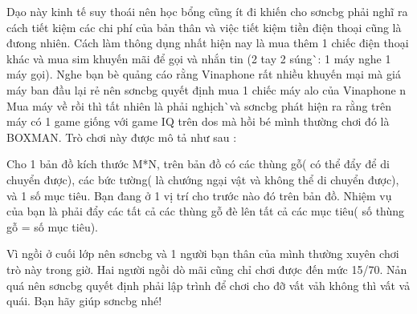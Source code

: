 Dạo này kinh tế suy thoái nên học bổng cũng ít đi khiến cho sơncbg phải nghĩ ra cách tiết kiệm các chi phí của bản thân và việc tiết kiệm tiền điện thoại cũng là đưong nhiên. Cách làm thông dụng nhất hiện nay là mua thêm 1 chiếc điện thoại khác và mua sim khuyến mãi để gọi và nhắn tin (2 tay 2 súng^^ : 1 máy nghe 1 máy gọi). Nghe bạn bè quảng cáo rằng Vinaphone rất nhiều khuyến mại mà giá máy ban đầu lại rẻ nên sơncbg quyết định mua 1 chiếc máy alo của Vinaphone ^^. Mua máy về rồi thì tất nhiên là phải nghịch^^ và sơncbg phát hiện ra rằng trên máy có 1 game giống với game IQ trên dos mà hồi bé mình thường chơi đó là BOXMAN. Trò chơi này được mô tả như sau :

Cho 1 bản đồ kích thước M*N, trên bản đồ có các thùng gỗ( có thể đẩy để di chuyển được), các bức tường( là chướng ngại vật và không thể di chuyển được), và 1 số mục tiêu. Bạn đang ở 1 vị trí cho trước nào đó trên bản đồ. Nhiệm vụ của bạn là phải đẩy các tất cả các thùng gỗ đè lên tất cả các mục tiêu( số thùng gỗ = số mục tiêu).

Vì ngồi ở cuối lớp nên sơncbg và 1 người bạn thân của mình thường xuyên chơi trò này trong giờ. Hai người ngồi dò mãi cũng chỉ chơi được đến mức 15/70. Nản quá nên sơncbg quyết định phải lập trình để chơi cho đỡ vất vả^^( không thì vất vả quá^^). Bạn hãy giúp sơncbg nhé!

\